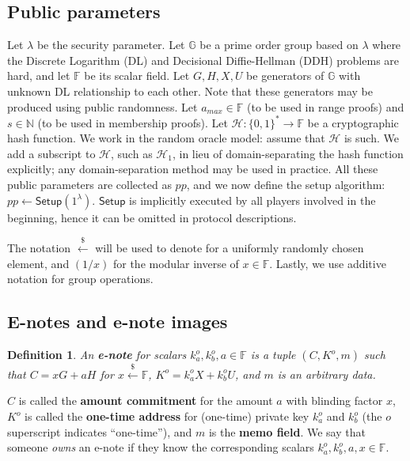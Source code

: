 \documentclass{article}
\newtheorem{definition}{Definition}[section]
\begin{document}
\subsection{Public parameters}
Let $\lambda$ be the security parameter. Let $\mathbb{G}$ be a prime order group based on $\lambda$ where the Discrete Logarithm (DL) and Decisional Diffie-Hellman (DDH) problems are hard, and let $\mathbb{F}$ be its scalar field. Let $G, H, X, U$ be generators of $\mathbb{G}$ with unknown DL relationship to each other. Note that these generators may be produced using public randomness. Let $a_{max}\in\mathbb{F}$ (to be used in range proofs) and $s\in\mathbb{N}$ (to be used in membership proofs). Let $\mathcal{H}:\{0,1\}^*\rightarrow\mathbb{F}$ be a cryptographic hash function. We work in the random oracle model: assume that $\mathcal{H}$ is such. We add a subscript to $\mathcal{H}$, such as $\mathcal{H}_1$, in lieu of domain-separating the hash function explicitly; any domain-separation method may be used in practice. All these public parameters are collected as $pp$, and we now define the setup algorithm: $pp\leftarrow\textsf{Setup}(1^{\lambda})$. $\textsf{Setup}$ is implicitly executed by all players involved in the beginning, hence it can be omitted in protocol descriptions.

The notation $\xleftarrow{\$}$ will be used to denote for a uniformly randomly chosen element, and $(1/x)$ for the modular inverse of $x\in\mathbb{F}$. Lastly, we use additive notation for group operations.

\subsection{E-notes and e-note images}
\begin{definition}\label{e-note}
An \textbf{\em e-note} for scalars $k_a^o, k_b^o, a \in\mathbb{F}$ is a tuple $(C, K^o, m)$ such that $C = x G + a H$ for $x\xleftarrow{\$}\mathbb{F}$, $K^o=k_a^o X + k_b^o U$, and $m$ is an arbitrary data.
\end{definition}
$C$ is called the \textbf{amount commitment} for the amount $a$ with blinding factor $x$, $K^o$ is called the \textbf{one-time address} for (one-time) private key $k_a^o$ and $k_b^o$ (the $o$ superscript indicates ``one-time''), and $m$ is the \textbf{memo field}. We say that someone \textit{owns} an e-note if they know the corresponding scalars $k_a^o, k_b^o, a, x \in\mathbb{F}$.
\end{document}
